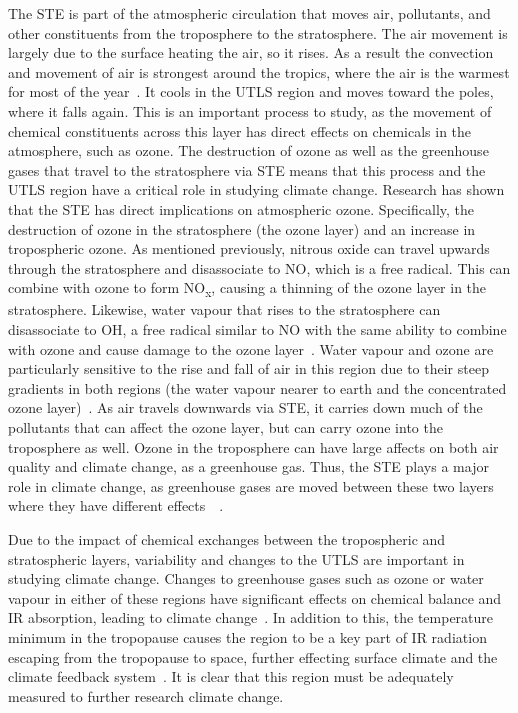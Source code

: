 The STE is part of the atmospheric circulation that moves air, pollutants, and other constituents from the troposphere to the stratosphere. The air movement is largely due to the surface heating the air, so it rises. As a result the convection and movement of air is strongest around the tropics, where the air is the warmest for most of the year~\citep{STE_text}. It cools in the UTLS region and moves toward the poles, where it falls again. This is an important process to study, as the movement of chemical constituents across this layer has direct effects on chemicals in the atmosphere, such as ozone. The destruction of ozone as well as the greenhouse gases that travel to the stratosphere via STE means that this process and the UTLS region have a critical role in studying climate change.
Research has shown that the STE has direct implications on atmospheric ozone. Specifically, the destruction of ozone in the stratosphere (the ozone layer) and an increase in tropospheric ozone. As mentioned previously, nitrous oxide can travel upwards through the stratosphere and disassociate to NO, which is a free radical. This can combine with ozone to form NO\textsubscript{x}, causing a thinning of the ozone layer in the stratosphere. Likewise, water vapour that rises to the stratosphere can disassociate to OH, a free radical similar to NO with the same ability to combine with ozone and cause damage to the ozone layer~\citep{WMO_ozone}. Water vapour and ozone are particularly sensitive to the rise and fall of air in this region due to their steep gradients in both regions (the water vapour nearer to earth and the concentrated ozone layer)~\citep{GLORIA_objectives}. As air travels downwards via STE, it carries down much of the pollutants that can affect the ozone layer, but can carry ozone into the troposphere as well. Ozone in the troposphere can have large affects on both air quality and climate change, as a greenhouse gas. Thus, the STE plays a major role in climate change, as greenhouse gases are moved between these two layers where they have different effects~\citep{STE_text}~\citep{UTLS_STE}.

Due to the impact of chemical exchanges between the tropospheric and stratospheric layers, variability and changes to the UTLS are important in studying climate change. Changes to greenhouse gases such as ozone or water vapour in either of these regions have significant effects on chemical balance and IR absorption, leading to climate change~\citep{climate_change_2007}. In addition to this, the temperature minimum in the tropopause causes the region to be a key part of IR radiation escaping from the tropopause to space, further effecting surface climate and the climate feedback system~\citep{ext_utls}. It is clear that this region must be adequately measured to further research climate change.

